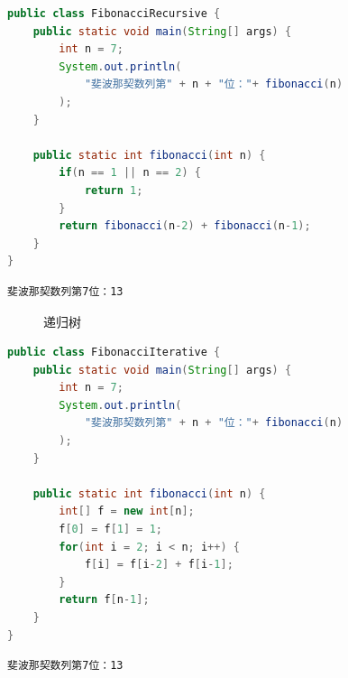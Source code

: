 
\begin{lstlisting}[language=Java]
public class FibonacciRecursive {
	public static void main(String[] args) {
		int n = 7;
		System.out.println(
			"斐波那契数列第" + n + "位："+ fibonacci(n)
		);
	}
	
	public static int fibonacci(int n) {
		if(n == 1 || n == 2) {
			return 1;
		}
		return fibonacci(n-2) + fibonacci(n-1);
	}
}
\end{lstlisting}

\begin{tcolorbox}
	\begin{verbatim}
斐波那契数列第7位：13
	\end{verbatim}
\end{tcolorbox}

\begin{figure}[H]
	\centering
	\caption{递归树}
\end{figure}


\begin{lstlisting}[language=Java]
public class FibonacciIterative {
	public static void main(String[] args) {
		int n = 7;
		System.out.println(
			"斐波那契数列第" + n + "位："+ fibonacci(n)
		);
	}
	
	public static int fibonacci(int n) {
		int[] f = new int[n];
		f[0] = f[1] = 1;
		for(int i = 2; i < n; i++) {
			f[i] = f[i-2] + f[i-1];
		}
		return f[n-1];
	}
}
\end{lstlisting}

\begin{tcolorbox}
	\begin{verbatim}
斐波那契数列第7位：13
	\end{verbatim}
\end{tcolorbox}

